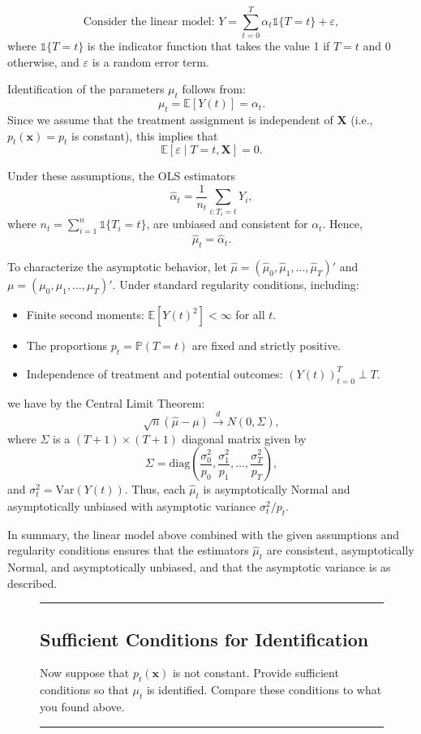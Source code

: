 \documentclass{article}
\newenvironment{colorparagraph}[1]{\par\color{#1}}{\par}
\begin{document}
\[
\text{Consider the linear model: } Y = \sum_{t=0}^T \alpha_t \mathbb{1}\{T=t\} + \varepsilon,
\]
where \(\mathbb{1}\{T=t\}\) is the indicator function that takes the value 1 if \(T=t\) and 0 otherwise, and \(\varepsilon\) is a random error term.

Identification of the parameters \(\mu_t\) follows from:
\[
\mu_t = \mathbb{E}[Y(t)] = \alpha_t.
\]
Since we assume that the treatment assignment is independent of \(\mathbf{X}\) (i.e., \(p_t(\mathbf{x})=p_t\) is constant), this implies that
\[
\mathbb{E}[\varepsilon \mid T=t, \mathbf{X}] = 0.
\]

Under these assumptions, the OLS estimators
\[
\hat{\alpha}_t = \frac{1}{n_t} \sum_{i: T_i=t} Y_i, 
\]
where \(n_t = \sum_{i=1}^n \mathbb{1}\{T_i=t\}\), are unbiased and consistent for \(\alpha_t\). Hence,
\[
\hat{\mu}_t = \hat{\alpha}_t.
\]

To characterize the asymptotic behavior, let \(\hat{\mu} = (\hat{\mu}_0, \hat{\mu}_1, \dots, \hat{\mu}_T)'\) and \(\mu = (\mu_0, \mu_1, \dots, \mu_T)'\). Under standard regularity conditions, including:
\begin{itemize}
\item Finite second moments: \(\mathbb{E}[Y(t)^2] < \infty\) for all \(t\).
\item The proportions \(p_t = \mathbb{P}(T=t)\) are fixed and strictly positive.
\item Independence of treatment and potential outcomes: \( (Y(t))_{t=0}^T \perp T \).
\end{itemize}
we have by the Central Limit Theorem:
\[
\sqrt{n} (\hat{\mu} - \mu) \xrightarrow{d} N(0, \Sigma),
\]
where \(\Sigma\) is a \((T+1)\times(T+1)\) diagonal matrix given by
\[
\Sigma = \mathrm{diag}\left(\frac{\sigma_0^2}{p_0}, \frac{\sigma_1^2}{p_1}, \dots, \frac{\sigma_T^2}{p_T}\right),
\]
and \(\sigma_t^2 = \mathrm{Var}(Y(t))\). Thus, each \(\hat{\mu}_t\) is asymptotically Normal and asymptotically unbiased with asymptotic variance \(\sigma_t^2 / p_t\).

In summary, the linear model above combined with the given assumptions and regularity conditions ensures that the estimators \(\hat{\mu}_t\) are consistent, asymptotically Normal, and asymptotically unbiased, and that the asymptotic variance is as described.
  
\begin{figure}[H]
  \begin{colorparagraph}{questioncolor}
  \rule{\textwidth}{0.5pt}
  \label{q1b}
  \subsection{Sufficient Conditions for Identification}
  
  Now suppose that \( p_t(\mathbf{x}) \) is not constant. Provide sufficient conditions so that \( \mu_t \) is identified. Compare these conditions to what you found above.
  
  \rule{\textwidth}{0.5pt}
  \end{colorparagraph}
\end{figure}
\end{document}
